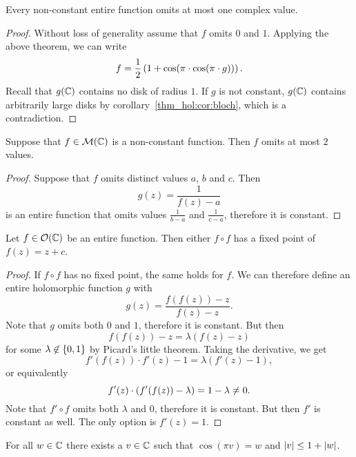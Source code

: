 \begin{izrek}
Every non-constant entire function omits at most one complex value.
\end{izrek}

\begin{proof}
Without loss of generality assume that $f$ omits $0$ and $1$.
Applying the above theorem, we can write
\[
f = \frac{1}{2} \left(1 + \cos(\pi \cdot \cos(\pi \cdot g))\right).
\]
Recall that $g(\mathbb{C})$ contains no disk of radius $1$. If $g$ is
not constant, $g(\mathbb{C})$ contains arbitrarily large disks by
corollary~\ref{thm_hol:cor:bloch}, which is a contradiction.
\end{proof}

\begin{posledica}
Suppose that $f \in \mathcal{M}(\mathbb{C})$ is a non-constant function.
Then $f$ omits at most $2$ values.
\end{posledica}

\begin{proof}
Suppose that $f$ omits distinct values $a$, $b$ and $c$. Then
\[
g(z) = \frac{1}{f(z) - a}
\]
is an entire function that omits values $\frac{1}{b-a}$ and
$\frac{1}{c-a}$, therefore it is constant.
\end{proof}

\begin{izrek}
Let $f \in \mathcal{O}(\mathbb{C})$ be an entire function. Then either
$f \circ f$ has a fixed point of $f(z) = z + c$.
\end{izrek}

\begin{proof}
If $f \circ f$ has no fixed point, the same holds for $f$. We can
therefore define an entire holomorphic function $g$ with
\[
g(z) = \frac{f(f(z)) - z}{f(z) - z}.
\]
Note that $g$ omits both $0$ and $1$, therefore it is constant. But
then
\[
f(f(z)) - z = \lambda (f(z) - z)
\]
for some $\lambda \not \in \left\{0, 1\right\}$ by Picard's little theorem.
Taking the derivative, we get
\[
f'(f(z)) \cdot f'(z) - 1 = \lambda (f'(z) - 1),
\]
or equivalently
\[
f'(z) \cdot \left(f'(f(z)) - \lambda\right) = 1 - \lambda \ne 0.
\]
Note that $f' \circ f$ omits both $\lambda$ and $0$, therefore it
is constant. But then $f'$ is constant as well. The only option is
$f'(z) = 1$.
\end{proof}


\begin{lema}
For all $w \in \mathbb{C}$ there exists a $v \in \mathbb{C}$ such that
$\cos(\pi v) = w$ and $\left\lvert v\right\rvert \leq 1 + \left\lvert w\right\rvert$.
\end{lema}

